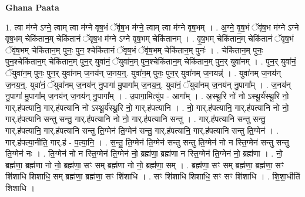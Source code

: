 \documentclass[17pt]{extarticle}
\begin{document}
\textbf{Ghana Paata } \newline

1. त्वा म॑ग्ने ऽग्ने॒ त्वाम् त्वा म॑ग्ने वृष॒भं ॅवृ॑ष॒भ म॑ग्ने॒ त्वाम् त्वा म॑ग्ने वृष॒भम् । . अ॒ग्ने॒ वृ॒ष॒भं ॅवृ॑ष॒भ म॑ग्ने ऽग्ने वृष॒भम् चेकि॑तान॒म् चेकि॑तानं ॅवृष॒भ म॑ग्ने ऽग्ने वृष॒भम् चेकि॑तानम् । . वृ॒ष॒भम् चेकि॑तान॒म् चेकि॑तानं ॅवृष॒भं ॅवृ॑ष॒भम् चेकि॑तान॒म् पुनः॒ पुन॒ श्चेकि॑तानं ॅवृष॒भं ॅवृ॑ष॒भम् चेकि॑तान॒म् पुनः॑ । . चेकि॑तान॒म् पुनः॒ पुन॒श्चेकि॑तान॒म् चेकि॑तान॒म् पुन॒र् युवा॑नं॒ ॅयुवा॑न॒म् पुन॒श्चेकि॑तान॒म् चेकि॑तान॒म् पुन॒र् युवा॑नम् । . पुन॒र् युवा॑नं॒ ॅयुवा॑न॒म् पुनः॒ पुन॒र् युवा॑नम् ज॒नय॑न् ज॒नय॒न्॒. युवा॑न॒म् पुनः॒ पुन॒र् युवा॑नम् ज॒नयन्न्॑ । . युवा॑नम् ज॒नय॑न् ज॒नय॒न्॒. युवा॑नं॒ ॅयुवा॑नम् ज॒नय॑न् नु॒पागा॑ मु॒पागा᳚म् ज॒नय॒न्॒. युवा॑नं॒ ॅयुवा॑नम् ज॒नय॑न् नु॒पागा᳚म् । . ज॒नय॑न् नु॒पागा॑ मु॒पागा᳚म् ज॒नय॑न् ज॒नय॑न् नु॒पागा᳚म् । . उ॒पागा॒मित्यु॑प - आगा᳚म् । . अ॒स्थू॒रि नो॑ नो ऽस्थू॒र्य॑स्थू॒रि नो॒ गार्.ह॑पत्यानि॒ गार्.ह॑पत्यानि नो ऽस्थू॒र्य॑स्थू॒रि नो॒ गार्.ह॑पत्यानि । . नो॒ गार्.ह॑पत्यानि॒ गार्.ह॑पत्यानि नो नो॒ गार्.ह॑पत्यानि सन्तु सन्तु॒ गार्.ह॑पत्यानि नो नो॒ गार्.ह॑पत्यानि सन्तु । . गार्.ह॑पत्यानि सन्तु सन्तु॒ गार्.ह॑पत्यानि॒ गार्.ह॑पत्यानि सन्तु ति॒ग्मेन॑ ति॒ग्मेन॑ सन्तु॒ गार्.ह॑पत्यानि॒ गार्.ह॑पत्यानि सन्तु ति॒ग्मेन॑ । . गार्.ह॑पत्या॒नीति॒ गार्.ह॑ - प॒त्या॒नि॒ । . स॒न्तु॒ ति॒ग्मेन॑ ति॒ग्मेन॑ सन्तु सन्तु ति॒ग्मेन॑ नो न स्ति॒ग्मेन॑ सन्तु सन्तु ति॒ग्मेन॑ नः । . ति॒ग्मेन॑ नो न स्ति॒ग्मेन॑ ति॒ग्मेन॑ नो॒ ब्रह्म॑णा॒ ब्रह्म॑णा न स्ति॒ग्मेन॑ ति॒ग्मेन॑ नो॒ ब्रह्म॑णा । . नो॒ ब्रह्म॑णा॒ ब्रह्म॑णा नो नो॒ ब्रह्म॑णा॒ सꣳ सम् ब्रह्म॑णा नो नो॒ ब्रह्म॑णा॒ सम् । . ब्रह्म॑णा॒ सꣳ सम् ब्रह्म॑णा॒ ब्रह्म॑णा॒ सꣳ शि॑शाधि शिशाधि॒ सम् ब्रह्म॑णा॒ ब्रह्म॑णा॒ सꣳ शि॑शाधि । . सꣳ शि॑शाधि शिशाधि॒ सꣳ सꣳ शि॑शाधि । . शि॒शा॒धीति॑ शिशाधि । \newline
\end{document}
